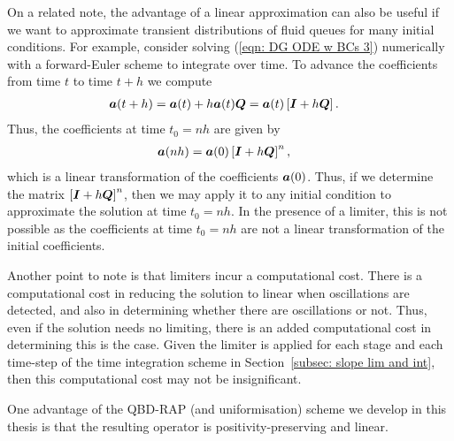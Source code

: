 On a related note, the advantage of a linear approximation can also be useful if we want to approximate transient distributions of fluid queues for many initial conditions. For example, consider solving (\ref{eqn: DG ODE w BCs 3}) numerically with a forward-Euler scheme to integrate over time. To advance the coefficients from time \(t\) to time \(t+h\) we compute
\begin{align*}
	&\boldsymbol a(t+h) = \boldsymbol a(t) + h \boldsymbol a(t)\boldsymbol Q = \boldsymbol a(t)\left[\boldsymbol I + h\boldsymbol Q\right].
\end{align*} 
Thus, the coefficients at time \(t_0=nh\) are given by 
\begin{align*}
	&\boldsymbol a(nh) = \boldsymbol a(0)\left[\boldsymbol I + h\boldsymbol Q\right]^n,
\end{align*} 
which is a linear transformation of the coefficients \(\boldsymbol a(0)\). Thus, if we determine the matrix \(\left[\boldsymbol I + h\boldsymbol Q\right]^n\), then we may apply it to any initial condition to approximate the solution at time \(t_0=nh\). In the presence of a limiter, this is not possible as the coefficients at time \(t_0=nh\) are not a linear transformation of the initial coefficients. 

Another point to note is that limiters incur a computational cost. There is a computational cost in reducing the solution to linear when oscillations are detected, and also in determining whether there are oscillations or not. Thus, even if the solution needs no limiting, there is an added computational cost in determining this is the case. Given the limiter is applied for each stage and each time-step of the time integration scheme in Section~\ref{subsec: slope lim and int}, then this computational cost may not be insignificant. 

One advantage of the QBD-RAP (and uniformisation) scheme we develop in this thesis is that the resulting operator is positivity-preserving and linear.
% 
% 
